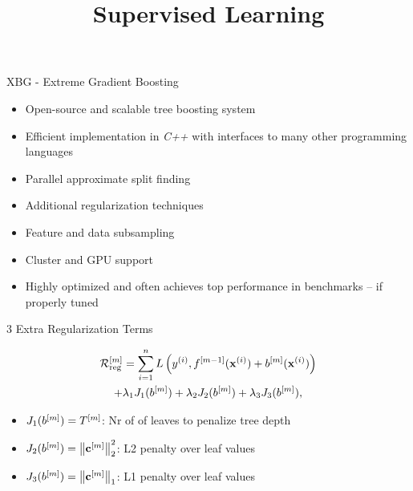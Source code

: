 \documentclass[11pt,compress,t,notes=noshow, xcolor=table]{beamer}
\title{Supervised Learning}
\date{}
\begin{document}


\begin{vbframe}{XBG - Extreme Gradient Boosting}



  \begin{itemize}
    \item Open-source and scalable tree boosting system
    \item Efficient implementation in \emph{C++} with interfaces to many other programming languages
    \item Parallel approximate split finding
    \item Additional regularization techniques
    \item Feature and data subsampling
    \item Cluster and GPU support
    \item Highly optimized and often achieves top performance in benchmarks 
        -- if properly tuned
  \end{itemize}

\end{vbframe}

\begin{frame}{3 Extra Regularization Terms}


  \begin{multline*}
    \mathcal{R}_{\text{reg}}^{[m]} = \sum_{i=1}^{n} L\left(y^{(i)}, f^{[m-1]}(\mathbf{x}^{(i)}) + b^{[m]}(\mathbf{x}^{(i)})\right)\\
    + \lambda_1 J_1(b^{[m]}) + \lambda_2 J_2(b^{[m]}) + \lambda_3 J_3(b^{[m]}),
  \end{multline*}

  \lz
  \begin{itemize}
    \item $J_1(b^{[m]}) = T^{[m]}$:  Nr of of leaves to penalize tree depth
    \item $J_2(b^{[m]}) = \left\|\mathbf{c}^{[m]}\right\|^2_2$:  L2 penalty over leaf values 
    \item $J_3(b^{[m]}) = \left\|\mathbf{c}^{[m]}\right\|_1$: L1 penalty over leaf values 
  \end{itemize}
\end{frame}
\end{document}
